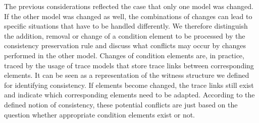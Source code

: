 The previous considerations reflected the case that only one model was changed.
If the other model was changed as well, the combinations of changes can lead to specific situations that have to be handled differently.
We therefore distinguish the addition, removal or change of a condition element to be processed by the consistency preservation rule and discuss what conflicts may occur by changes performed in the other model.
Changes of condition elements are, in practice, traced by the usage of trace models that store trace links between corresponding elements.
It can be seen as a representation of the witness structure we defined for identifying consistency.
If elements become changed, the trace links still exist and indicate which corresponding elements need to be adapted.
According to the defined notion of consistency, these potential conflicts are just based on the question whether appropriate condition elements exist or not.
